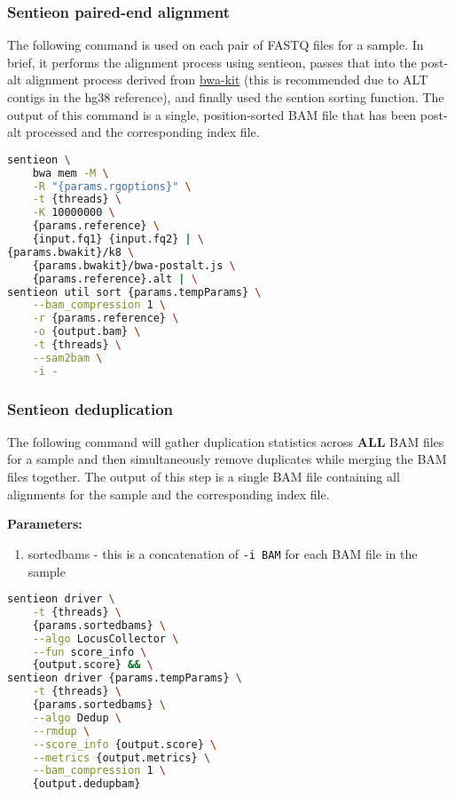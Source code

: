 \subsubsection{Sentieon paired-end alignment}
The following command is used on each pair of FASTQ files for a sample.  In brief, it performs the alignment process using sentieon, passes that into the post-alt alignment process derived from \href{https://github.com/lh3/bwa/blob/master/README-alt.md}{bwa-kit} (this is recommended due to ALT contigs in the hg38 reference), and finally used the sention sorting function.  The output of this command is a single, position-sorted BAM file that has been post-alt processed and the corresponding index file.

\begin{lstlisting}[language=bash]
sentieon \
    bwa mem -M \
    -R "{params.rgoptions}" \
    -t {threads} \
    -K 10000000 \
    {params.reference} \
    {input.fq1} {input.fq2} | \
{params.bwakit}/k8 \
    {params.bwakit}/bwa-postalt.js \
    {params.reference}.alt | \
sentieon util sort {params.tempParams} \
    --bam_compression 1 \
    -r {params.reference} \
    -o {output.bam} \
    -t {threads} \
    --sam2bam \
    -i -
\end{lstlisting}

\subsubsection{Sentieon deduplication}
The following command will gather duplication statistics across \textbf{ALL} BAM files for a sample and then simultaneously remove duplicates while merging the BAM files together.  The output of this step is a single BAM file containing all alignments for the sample and the corresponding index file.

\noindent\textbf{Parameters:}
\begin{enumerate}
    \item sortedbams - this is a concatenation of \texttt{-i BAM} for each BAM file in the sample
\end{enumerate}

\begin{lstlisting}[language=bash]
sentieon driver \
    -t {threads} \
    {params.sortedbams} \
    --algo LocusCollector \
    --fun score_info \
    {output.score} && \
sentieon driver {params.tempParams} \
    -t {threads} \
    {params.sortedbams} \
    --algo Dedup \
    --rmdup \
    --score_info {output.score} \
    --metrics {output.metrics} \
    --bam_compression 1 \
    {output.dedupbam}
\end{lstlisting}

